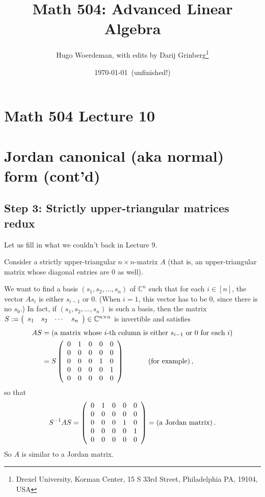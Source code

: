\documentclass[numbers=enddot,12pt,final,onecolumn,notitlepage]{scrartcl}%
\numberwithin{exer}{subsection}
\theoremstyle{definition}
\begin{document}
\title{Math 504: Advanced Linear Algebra}
\author{Hugo Woerdeman, with edits by Darij Grinberg\thanks{Drexel University, Korman
Center, 15 S 33rd Street, Philadelphia PA, 19104, USA}}
\date{\today\ (unfinished!)}
\maketitle
\tableofcontents

\section*{Math 504 Lecture 10}

\section{Jordan canonical (aka normal) form (cont'd)}

\subsection{Step 3: Strictly upper-triangular matrices redux}

Let us fill in what we couldn't back in Lecture 9.

Consider a strictly upper-triangular $n\times n$-matrix $A$ (that is, an
upper-triangular matrix whose diagonal entries are $0$ as well).

We want to find a basis $\left(  s_{1},s_{2},\ldots,s_{n}\right)  $ of
$\mathbb{C}^{n}$ such that for each $i\in\left[  n\right]  $, the vector
$As_{i}$ is either $s_{i-1}$ or $0$. (When $i=1$, this vector has to be $0$,
since there is no $s_{0}$.) In fact, if $\left(  s_{1},s_{2},\ldots
,s_{n}\right)  $ is such a basis, then the matrix $S:=\left(
\begin{array}
[c]{cccc}%
s_{1} & s_{2} & \cdots & s_{n}%
\end{array}
\right)  \in\mathbb{C}^{n\times n}$ is invertible and satisfies%
\begin{align*}
AS  & =\left(  \text{a matrix whose }i\text{-th column is either }%
s_{i-1}\text{ or }0\text{ for each }i\right)  \\
& =S\left(
\begin{array}
[c]{ccccc}%
0 & 1 & 0 & 0 & 0\\
0 & 0 & 0 & 0 & 0\\
0 & 0 & 0 & 1 & 0\\
0 & 0 & 0 & 0 & 1\\
0 & 0 & 0 & 0 & 0
\end{array}
\right)  \ \ \ \ \ \ \ \ \ \ \left(  \text{for example}\right)  ,
\end{align*}
so that%
\[
S^{-1}AS=\left(
\begin{array}
[c]{ccccc}%
0 & 1 & 0 & 0 & 0\\
0 & 0 & 0 & 0 & 0\\
0 & 0 & 0 & 1 & 0\\
0 & 0 & 0 & 0 & 1\\
0 & 0 & 0 & 0 & 0
\end{array}
\right)  =\left(  \text{a Jordan matrix}\right)  .
\]
So $A$ is similar to a Jordan matrix.
\end{document}
